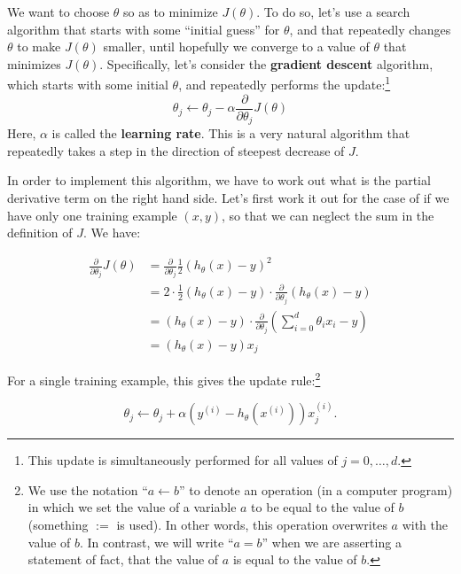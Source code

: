 We want to choose $\theta$ so as to minimize $J(\theta)$. To do so, let's use a search
algorithm that starts with some ``initial guess'' for $\theta$, and that repeatedly
changes $\theta$ to make $J(\theta)$ smaller, until hopefully we converge to a value of
$\theta$ that minimizes $J(\theta)$. Specifically, let's consider the \textbf{gradient descent}
algorithm, which starts with some initial $\theta$, and repeatedly performs the
update:\footnote{This update is simultaneously performed for all values of $j = 0,\ldots,d$.} %
%
\begin{equation}
    \theta_j \leftarrow \theta_j - \alpha \frac{\partial}{\partial \theta_j} J(\theta) %
\end{equation}
%
Here, $\alpha$ is called the \textbf{learning rate}. This is a very natural algorithm that
repeatedly takes a step in the direction of steepest decrease of $J$.

In order to implement this algorithm, we have to work out what is the
partial derivative term on the right hand side. Let's first work it out for the
case of if we have only one training example $(x,y)$, so that we can neglect
the sum in the definition of $J$. We have:

\begin{align*}
    \frac{\partial}{\partial \theta_j} J(\theta) &= \frac{\partial}{\partial \theta_j} \frac 1 2 \left( h_\theta(x) - y \right)^2\\
    &= 2 \cdot \frac 1 2 (h_\theta(x) - y) \cdot \frac{\partial}{\partial \theta_j} (h_\theta(x) - y) \\
    &= (h_\theta(x) - y) \cdot \frac{\partial}{\partial \theta_j} \left( \sum_{i=0}^d \theta_i x_i - y \right) \\
    &= (h_\theta(x) - y) x_j
\end{align*}

For a single training example, this gives the update rule:\footnote{We use the notation ``$a \leftarrow b$'' to denote an operation (in a computer program) in
which we set the value of a variable $a$ to be equal to the value of $b$ (something $:=$ is used). In other words, this
operation overwrites $a$ with the value of $b$. In contrast, we will write ``$a = b$'' when we are
asserting a statement of fact, that the value of $a$ is equal to the value of $b$.}

\begin{equation}
    \theta_j \leftarrow \theta_j + \alpha \left( y^{(i)} - h_\theta(x^{(i)}) \right) x^{(i)}_j \text{.} %
\end{equation}

